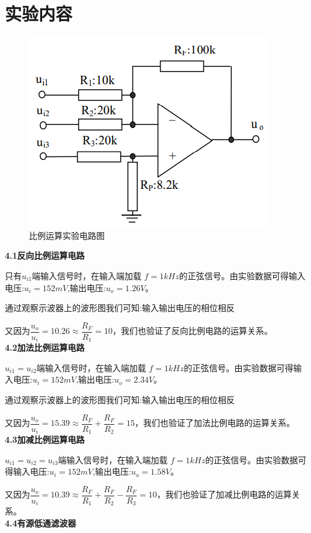 \documentclass[a4 paper,12pt]{article}
\begin{document}
	\section{实验内容}
\noindent
	\begin{figure}[H]
		\centering
		\hspace{2em}\includegraphics[width=.5\linewidth]{pic/8.png}
		\caption{\small{比例运算实验电路图}
		}
	\end{figure}
\noindent
\textbf{4.1反向比例运算电路}
\par 只有$u_{i1}$端输入信号时，在输入端加载 $f=1kHz
$的正弦信号。由实验数据可得输入电压:$u_{i}=152mV$,输出电压:$u_{o}=1.26V$。
\par 通过观察示波器上的波形图我们可知:输入输出电压的相位相反
\par 又因为$\dfrac{u_{o}}{u_{i}}=10.26\approx \dfrac{R_{F}}{R_{1}}=10$，我们也验证了反向比例电路的运算关系。
\\
\textbf{4.2加法比例运算电路}
\par $u_{i1}=u_{i2}$端输入信号时，在输入端加载 $f=1kHz
$的正弦信号。由实验数据可得输入电压:$u_{i}=152mV$,输出电压:$u_{o}=2.34V$。
\par 通过观察示波器上的波形图我们可知:输入输出电压的相位相反
\par 又因为$\dfrac{u_{o}}{u_{i}}=15.39\approx \dfrac{R_{F}}{R_{1}}+\dfrac{R_{F}}{R_{2}}=15$，我们也验证了加法比例电路的运算关系。
\\
\textbf{4.3加减比例运算电路}
\par $u_{i1}=u_{i2}=u_{i3}$端输入信号时，在输入端加载 $f=1kHz
$的正弦信号。由实验数据可得输入电压:$u_{i}=152mV$,输出电压:$u_{o}=1.58V$。
\par 又因为$\dfrac{u_{o}}{u_{i}}=10.39\approx \dfrac{R_{F}}{R_{1}}+\dfrac{R_{F}}{R_{2}}-\dfrac{R_{F}}{R_{3}}=10$，我们也验证了加减比例电路的运算关系。
\\
\textbf{4.4有源低通滤波器}
\begin{table}[H]
	\centering
	\caption{有源低通滤波器数据表}
\end{table}
\end{document}
